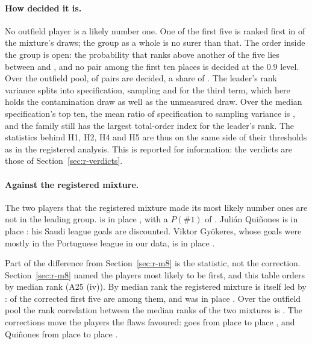 \documentclass[11pt,a4paper]{article}
\begin{document}
\paragraph{How decided it is.}
No outfield player is a likely number one. One of the first five is ranked
first in \CorrectedTopFivePFirstSum{} of the mixture's draws; the group as a
whole is no surer than that. The order inside the group is open: the
probability that \CorrectedTopName{} ranks above another of the five lies
between \CorrectedTopPairLo{} and \CorrectedTopPairHi{}, and no pair among the
first ten places is decided at the 0.9 level. Over the outfield pool,
\CorrectedNPairsDecided{} of \NPairsOutfield{} pairs are decided, a share of
\CorrectedSharePairsDecided{}. The leader's rank variance splits into
\CorrectedTopVarSpec{} specification, \CorrectedTopVarSamp{} sampling and
\CorrectedTopVarUnm{} for the third term, which here holds the contamination
draw as well as the unmeasured draw. Over the median specification's top ten,
the mean ratio of specification to sampling variance is
\CorrectedHFourRatio{}, and the family still has the largest total-order index
for the leader's rank. The statistics behind H1, H2, H4 and H5 are thus on the
same side of their thresholds as in the registered analysis. This is reported
for information: the verdicts are those of Section~\ref{sec:r-verdicts}.

\paragraph{Against the registered mixture.}
The two players that the registered mixture made its most likely number ones
are not in the leading group. \TopPlayerName{} is in place
\CorrectedRegLeaderPlace{}, with a $P(\#1)$ of \CorrectedRegLeaderPFirst{}.
Julián Quiñones is in place \CorrectedQuinonesPlace{}: his Saudi league goals
are discounted. Viktor Gyökeres, whose goals were mostly in the Portuguese
league in our data, is in place \CorrectedGyokeresPlace{}.

Part of the difference from Section~\ref{sec:r-m8} is the statistic, not the
correction. Section~\ref{sec:r-m8} named the players most likely to be first,
and this table orders by median rank (A25 (iv)). By median rank the registered
mixture is itself led by \RegisteredTopFive{}:
\CorrectedTopFiveInRegistered{} of the corrected first five are among them,
and \CorrectedTopFiveNewName{} was in place
\CorrectedTopFiveNewRegisteredPlace{}. Over the outfield pool the rank
correlation between the median ranks of the two mixtures is
\CorrectedSpearmanRegistered{}. The corrections move the players the flaws
favoured: \TopPlayerName{} goes from place \RegisteredLeaderPlace{} to
place \CorrectedRegLeaderPlace{}, and Quiñones from place
\RegisteredQuinonesPlace{} to place \CorrectedQuinonesPlace{}.
\end{document}
